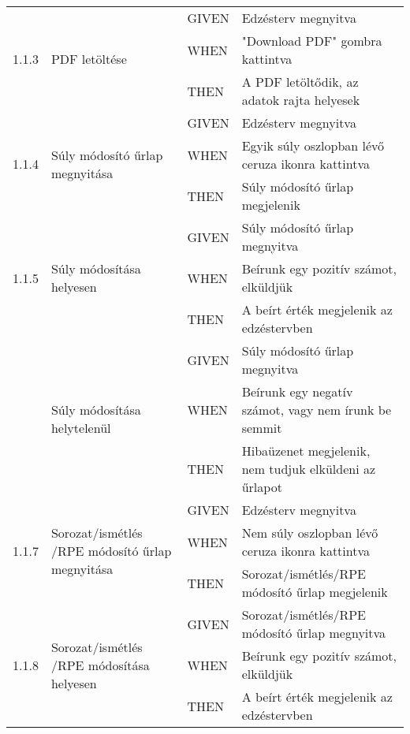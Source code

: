 \begin{center}
\begin{longtable}{ | p{} | p{} | p{} | p{} | }
			\multirow{3}{*}{1.1.3} 
			& \multirow{3}{=}{PDF letöltése} 
			& GIVEN 
			& Edzésterv megnyitva \\
			\cline{3-4}
			& & WHEN 
			& "Download PDF" gombra kattintva \\
			\cline{3-4}
			& & THEN 
			& A PDF letöltődik, az adatok rajta helyesek \\
			\hline

			\multirow{3}{*}{1.1.4} 
			& \multirow{3}{=}{Súly módosító űrlap megnyitása} 
			& GIVEN 
			& Edzésterv megnyitva \\
			\cline{3-4}
			& & WHEN 
			& Egyik súly oszlopban lévő ceruza ikonra kattintva \\
			\cline{3-4}
			& & THEN 
			& Súly módosító űrlap megjelenik \\
			\hline

			\multirow{3}{*}{1.1.5} 
			& \multirow{3}{=}{Súly módosítása helyesen} 
			& GIVEN 
			& Súly módosító űrlap megnyitva \\
			\cline{3-4}
			& & WHEN 
			& Beírunk egy pozitív számot, elküldjük \\
			\cline{3-4}
			& & THEN 
			& A beírt érték megjelenik az edzéstervben \\
			\hline

			\pagebreak

			\multirow{3}{*}{1.1.6} 
			& \multirow{3}{=}{Súly módosítása helytelenül} 
			& GIVEN 
			& Súly módosító űrlap megnyitva \\
			\cline{3-4}
			& & WHEN 
			& Beírunk egy negatív számot, vagy nem írunk be semmit \\
			\cline{3-4}
			& & THEN 
			& Hibaüzenet megjelenik, nem tudjuk elküldeni az űrlapot \\
			\hline

			\multirow{3}{*}{1.1.7} 
			& \multirow{3}{=}{Sorozat/ismétlés /RPE módosító űrlap megnyitása} 
			& GIVEN 
			& Edzésterv megnyitva \\
			\cline{3-4}
			& & WHEN 
			& Nem súly oszlopban lévő ceruza ikonra kattintva \\
			\cline{3-4}
			& & THEN 
			& Sorozat/ismétlés/RPE módosító űrlap megjelenik \\
			\hline

			\multirow{3}{*}{1.1.8} 
			& \multirow{3}{=}{Sorozat/ismétlés /RPE módosítása helyesen} 
			& GIVEN 
			& Sorozat/ismétlés/RPE módosító űrlap megnyitva \\
			\cline{3-4}
			& & WHEN 
			& Beírunk egy pozitív számot, elküldjük \\
			\cline{3-4}
			& & THEN 
			& A beírt érték megjelenik az edzéstervben \\
			\hline


\end{longtable}
\end{center}
